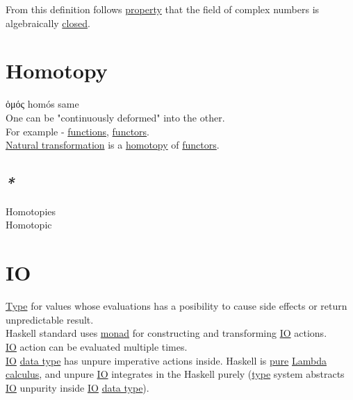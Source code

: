 \documentclass[a4paper,14pt,oneside]{book}
\begin{document}
From this definition follows \hyperref[orgc713167]{property} that the field of complex numbers is algebraically \hyperref[org61442b1]{closed}.\\

\chapter{\label{orgcdc24f4}Homotopy}
\label{sec:org7dd671b}
ὁμός homós same\\

One can be "continuously deformed" into the other.\\

For example - \hyperref[org2d0eb2e]{functions}, \hyperref[org7f51692]{functors}.\\
\hyperref[org095dd82]{Natural transformation} is a \hyperref[orgcdc24f4]{homotopy} of \hyperref[org7f51692]{functors}.\\

\section{\emph{*}}
\label{sec:orgd3066f3}

\label{org0e3e259}Homotopies\\
\label{org031cd58}Homotopic\\

\chapter{\label{org654a43e}IO}
\label{sec:org5323c44}
\hyperref[orgc4a7610]{Type} for values whose evaluations has a posibility to cause side effects or return unpredictable result.\\
Haskell standard uses \hyperref[orga2ae3ba]{monad} for constructing and transforming \hyperref[org654a43e]{IO} actions.\\
\hyperref[org654a43e]{IO} action can be evaluated multiple times.\\

\hyperref[org654a43e]{IO} \hyperref[orga27e24d]{data type} has unpure imperative actions inside. Haskell is \hyperref[org6d0d804]{pure} \hyperref[orgb662a27]{Lambda calculus}, and unpure \hyperref[org654a43e]{IO} integrates in the Haskell purely (\hyperref[orgc4a7610]{type} system abstracts \hyperref[org654a43e]{IO} unpurity inside \hyperref[org654a43e]{IO} \hyperref[orga27e24d]{data type}).\\
\end{document}
